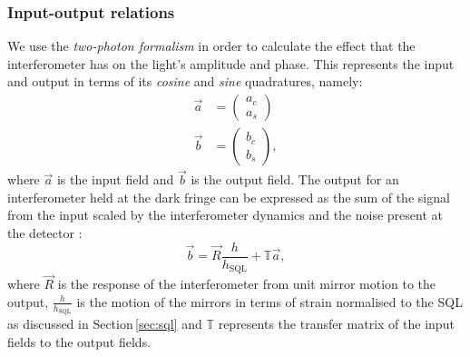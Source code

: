 \subsubsection{Input-output relations}
We use the \emph{two-photon formalism} \cite{Caves1985, Schumaker1985} in order to calculate the effect that the interferometer has on the light's amplitude and phase. This represents the input and output in terms of its \emph{cosine} and \emph{sine} quadratures, namely:
\begin{align}
  \vec{a} &=
  \begin{pmatrix}
    a_c \\
    a_s
  \end{pmatrix} \\
  \vec{b} &=
  \begin{pmatrix}
    b_c \\
    b_s
  \end{pmatrix},
\end{align}
where $\vec{a}$ is the input field and $\vec{b}$ is the output field. The output for an interferometer held at the dark fringe can be expressed as the sum of the signal from the input scaled by the interferometer dynamics and the noise present at the detector \cite{Danilishin2015}:
\begin{equation}
  \label{eq:ifo-output-signal}
  \vec{b} = \vec{R} \frac{h}{h_{\text{SQL}}} + \mathbb{T} \vec{a},
\end{equation}
where $\vec{R}$ is the response of the interferometer from unit mirror motion to the output, $\frac{h}{h_{\text{SQL}}}$ is the motion of the mirrors in terms of strain normalised to the \gls{SQL} as discussed in Section\,\ref{sec:sql} and $\mathbb{T}$ represents the transfer matrix of the input fields to the output fields.

